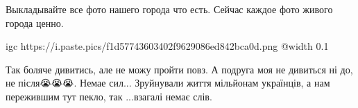  
 
 
 
 

\qqSecCmt


Выкладывайте все фото нашего города что есть. Сейчас каждое фото живого города
ценно.


\ifcmt
  igc https://i.paste.pics/f1d57743603402f9629086ed842bca0d.png
	@width 0.1
\fi


Так боляче дивитись, але не можу пройти повз. А подруга моя не дивиться ні до,
не після😭😭😭. Немае сил... Зруйнували життя мільйонам українців, а нам
пережившим тут пекло, так ...взагалі немає слів.
